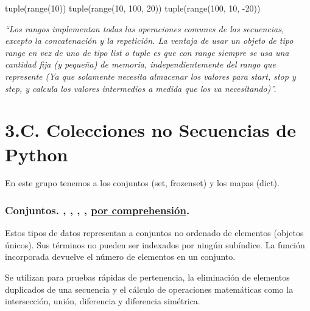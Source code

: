 \begin{example}{}
\begin{pyconsole}[][frame=single]
tuple(range(10))
tuple(range(10, 100, 20))
tuple(range(100, 10, -20))
\end{pyconsole}
\end{example}


\begin{note}
\textit{``Los rangos implementan todas las operaciones comunes de las secuencias, excepto la concatenación y la repetición. La ventaja de usar un objeto de tipo range en vez de uno de tipo list o tuple es que con range siempre se usa una cantidad fija (y pequeña) de memoria, independientemente del rango que represente (Ya que solamente necesita almacenar los valores para start, stop y step, y calcula los valores intermedios a medida que los va necesitando)''.}
\end{note}






\section*{3.C. Colecciones no Secuencias de Python}


En este grupo tenemos a los conjuntos (set, frozenset) y los mapas (dict).


\subsubsection*{Conjuntos.  \cm{\{\}},  , , , \underline{por comprehensión}.}

Estos tipos de datos representan a conjuntos no ordenado de elementos (objetos únicos). Sus términos no pueden ser indexados por ningún subíndice. La función incorporada  devuelve el número de elementos en un conjunto.

Se utilizan para pruebas rápidas de pertenencia, la eliminación de elementos duplicados de una secuencia y el cálculo de operaciones matemáticas como la intersección, unión, diferencia y diferencia simétrica.

